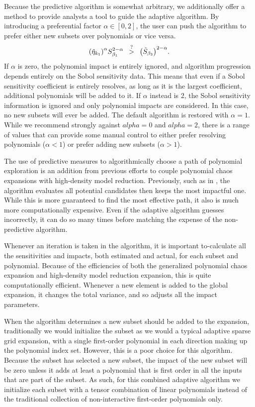 Because the predictive algorithm is somewhat arbitrary, we additionally offer a method to provide analysts a
tool to guide the adaptive algorithm.  By introducing a preferential factor $\alpha\in[0,2]$, the user can
push the algorithm to prefer either new subsets over polynomials or vice versa.
\begin{equation}
  \qty(\tilde\eta_{k_1})^\alpha S_{\beta_1}^{2-\alpha} \hspace{5pt}\stackrel{?}>\hspace{5pt} 
         \qty(\tilde S_{\beta_3})^{2-\alpha}.
\end{equation}
If $\alpha$ is zero, the polynomial impact is entirely ignored, and algorithm progression depends entirely on
the Sobol sensitivity data.  This means that even if a Sobol sensitivity coefficient is entirely resolves, as
long as it is the largest coefficient, additional polynomials will be added to it.  If $\alpha$ instead is 2,
the Sobol sensitivity information is ignored and only polynomial impacts are considered.  In this case, no new
subsets will ever be added.  The default algorithm is restored with $\alpha=1$.  While we recommend strongly
against $alpha=0$ and $alpha=2$, there is a range of values that can provide some manual control to either
prefer resolving polynomials ($\alpha<1$) or prefer adding new subsets ($\alpha > 1$).

The use of predictive measures to algorithmically choose a path of polynomial exploration is an addition from 
previous efforts to couple
polynomial chaos expansions with high-density model reduction.  Previously, such as in \cite{Gerstner}, the
algorithm evaluates all potential candidates then keeps the most impactful one.  While this is more guaranteed
to find the most effective path, it also is much more computationally expensive.  Even if the adaptive
algorithm guesses incorrectly, it can do so many times before matching the expense of the non-predictive
algorithm.

Whenever an iteration is taken in the algorithm, it is important to-calculate all the sensitivities and
impacts, both estimated and actual, for each subset and polynomial.  Because of the efficiencies of both the
generalized polynomial chaos expansion and high-density model reduction expansion, this is quite
computationally efficient.  Whenever a new element is added to the global expansion, it changes the total
variance, and so adjusts all the impact parameters.

When the algorithm determines a new subset should be added to the expansion, traditionally we would initialize
the subset as we would a typical adaptive sparse grid expansion, with a single first-order polynomial in each
direction making up the polynomial index set.  However, this is a poor choice for this algorithm.  Because the
subset has selected a new subset, the impact of the new subset will be zero unless it adds at least a
polynomial that is first order in all the inputs that are part of the subset.  As such, for this combined
adaptive algorithm we initialize each subset with a tensor combination of linear polynomials instead of the
traditional collection of non-interactive first-order polynomials only.

